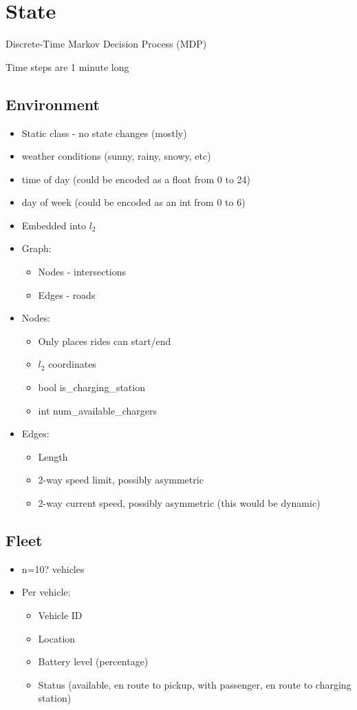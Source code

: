 \documentclass[12pt]{article}
\begin{document}
\psetheader %

\section*{State}
Discrete-Time Markov Decision Process (MDP)

Time steps are 1 minute long

\subsection*{Environment}
\begin{itemize}
		\item Static class - no state changes (mostly)
		\item weather conditions (sunny, rainy, snowy, etc)
		\item time of day (could be encoded as a float from 0 to 24)
		\item day of week (could be encoded as an int from 0 to 6)
		\item Embedded into $l_2$
		\item Graph:
				\begin{itemize}
						\item Nodes - intersections
						\item Edges - roads
				\end{itemize}
		\item Nodes:
				\begin{itemize}
						\item Only places rides can start/end
						\item $l_2$ coordinates
						\item bool is\_charging\_station
						\item int num\_available\_chargers
				\end{itemize}
		\item Edges:
				\begin{itemize}
						\item Length
						\item 2-way speed limit, possibly asymmetric
						\item {} 2-way current speed, possibly asymmetric (this would be dynamic)
				\end{itemize}
\end{itemize}
\subsection*{Fleet}
\begin{itemize}
		\item n=10? vehicles
		\item Per vehicle:
    \begin{itemize}
						\item Vehicle ID
						\item Location
						\item Battery level (percentage)
						\item Status (available, en route to pickup, with passenger, en route to charging station)
    \end{itemize}
\end{itemize}
\end{document}
